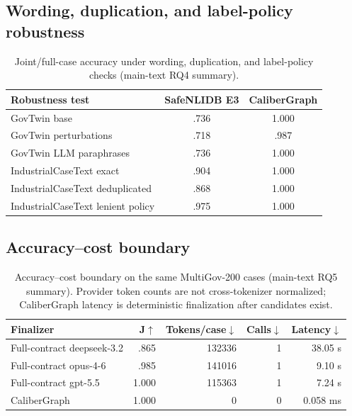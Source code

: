 \documentclass[letterpaper]{article}
\begin{document}
\subsection[Wording and label-policy robustness]{Wording, duplication, and label-policy robustness}

\begin{table}[h]
\centering
\scriptsize
\begin{tabular}{lcc}
\toprule
Robustness test & SafeNLIDB E3 & CaliberGraph \\
\midrule
GovTwin base & .736 & 1.000 \\
GovTwin perturbations & .718 & .987 \\
GovTwin LLM paraphrases & .736 & 1.000 \\
IndustrialCaseText exact & .904 & 1.000 \\
IndustrialCaseText deduplicated & .868 & 1.000 \\
IndustrialCaseText lenient policy & .975 & 1.000 \\
\bottomrule
\end{tabular}
\caption{Joint/full-case accuracy under wording, duplication, and label-policy checks (main-text RQ4 summary).}
\label{tab:robustness-supp}
\end{table}

\subsection{Accuracy--cost boundary}

\begin{table}[h]
\centering
\scriptsize
\setlength{\tabcolsep}{2.4pt}
\begin{tabular}{lrrrr}
\toprule
Finalizer & J$\uparrow$ & Tokens/case$\downarrow$ & Calls$\downarrow$ & Latency$\downarrow$ \\
\midrule
Full-contract deepseek-3.2 & .865 & 132336 & 1 & 38.05 s \\
Full-contract opus-4-6 & .985 & 141016 & 1 & 9.10 s \\
Full-contract gpt-5.5 & 1.000 & 115363 & 1 & 7.24 s \\
CaliberGraph & 1.000 & 0 & 0 & 0.058 ms \\
\bottomrule
\end{tabular}
\caption{Accuracy--cost boundary on the same MultiGov-200 cases (main-text RQ5 summary). Provider token counts are not cross-tokenizer normalized; CaliberGraph latency is deterministic finalization after candidates exist.}
\label{tab:cost-supp}
\end{table}
\end{document}
